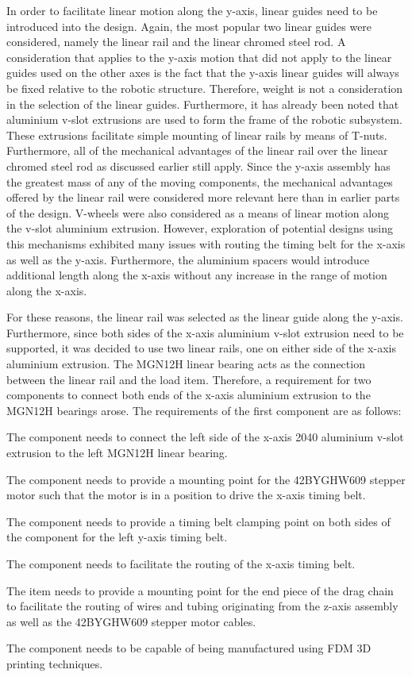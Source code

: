 In order to facilitate linear motion along the y-axis, linear guides need to be introduced into the design. Again, the most popular two linear guides were considered, namely the linear rail and the linear chromed steel rod. A consideration that applies to the y-axis motion that did not apply to the linear guides used on the other axes is the fact that the y-axis linear guides will always be fixed relative to the robotic structure. Therefore, weight is not a consideration in the selection of the linear guides. Furthermore, it has already been noted that aluminium v-slot extrusions are used to form the frame of the robotic subsystem. These extrusions facilitate simple mounting of linear rails by means of T-nuts. Furthermore, all of the mechanical advantages of the linear rail over the linear chromed steel rod as discussed earlier still apply. Since the y-axis assembly has the greatest mass of any of the moving components, the mechanical advantages offered by the linear rail were considered more relevant here than in earlier parts of the design. V-wheels were also considered as a means of linear motion along the v-slot aluminium extrusion. However, exploration of potential designs using this mechanisms exhibited many issues with routing the timing belt for the x-axis as well as the y-axis. Furthermore, the aluminium spacers would introduce additional length along the x-axis without any increase in the range of motion along the x-axis. 

For these reasons, the linear rail was selected as the linear guide along the y-axis. Furthermore, since both sides of the x-axis aluminium v-slot extrusion need to be supported, it was decided to use two linear rails, one on either side of the x-axis aluminium extrusion. The MGN12H linear bearing acts as the connection between the linear rail and the load item. Therefore, a requirement for two components to connect both ends of the x-axis aluminium extrusion to the MGN12H bearings arose. The requirements of the first component are as follows:

\begin{compactitem}
	\item The component needs to connect the left side of the x-axis 2040 aluminium v-slot extrusion to the left MGN12H linear bearing.
	\item The component needs to provide a mounting point for the 42BYGHW609 stepper motor such that the motor is in a position to drive the x-axis timing belt.
	\item The component needs to provide a timing belt clamping point on both sides of the component for the left y-axis timing belt.
	\item The component needs to facilitate the routing of the x-axis timing belt.
	\item The item needs to provide a mounting point for the end piece of the drag chain to facilitate the routing of wires and tubing originating from the z-axis assembly as well as the 42BYGHW609 stepper motor cables.
	\item The component needs to be capable of being manufactured using \ac{FDM} 3D printing techniques.
\end{compactitem}

